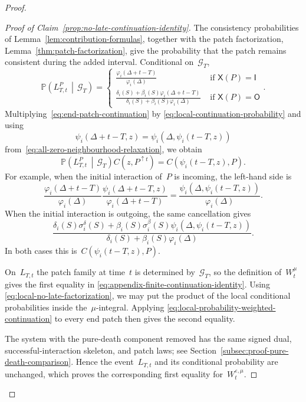\documentclass[EJP,preprint,NODS,nobera]{ejpecp}
\newcommand{\pP}{\mathbb{P}}
\newcommand{\CP}[2]{\pP\bb{#1\,\middle|\,#2}}
\newcommand{\bb}[1]{\left(#1\right)}
\newcommand{\pw}[4]{\left\{\begin{array}{cl}
  #1 &\text{ if } #2 \\
  #3 &\text{ if } #4
\end{array}\right.}
\newcommand{\chg}[1]{{\color{changegreen}#1}}
\begin{document}
\begin{proof}
\begin{proof}[Proof of Claim~\ref{prop:no-late-continuation-identity}]
The \chg{consistency probabilities of Lemma~\ref{lem:contribution-formulas},
together with the patch factorization, Lemma~\ref{thm:patch-factorization},}
give the probability that the patch remains consistent
during the added interval. Conditional on~$\mathcal G_T$,
\begin{equation}
\label{eq:local-continuation-probability}
\CP{L_{T,t}^P}{\mathcal G_T}
=
\pw{
\displaystyle
\frac{\varphi_i(\Delta+t-T)}{\varphi_i(\Delta)}
}{\mathsf X(P)=\mathsf I}
{
\displaystyle
\frac{
\delta_i(S)+\beta_i(S)\varphi_i(\Delta+t-T)
}{
\delta_i(S)+\beta_i(S)\varphi_i(\Delta)
}
}{\mathsf X(P)=\mathsf O}.
\end{equation}
Multiplying~\eqref{eq:end-patch-continuation} by
\eqref{eq:local-continuation-probability} and using
\begin{equation*}
\psi_i(\Delta+t-T,z)
=
\psi_i\bb{\Delta,\psi_i(t-T,z)}
\end{equation*}
from~\eqref{eq:all-zero-neighbourhood-relaxation}, we obtain
\begin{equation}
\label{eq:local-probability-weighted-continuation}
\CP{L_{T,t}^P}{\mathcal G_T}
C\bb{z,P^{\uparrow t}}
=
C\bb{\psi_i(t-T,z),P}.
\end{equation}
For example, when the initial interaction of~$P$ is incoming, the left-hand
side is
\begin{equation*}
\frac{\varphi_i(\Delta+t-T)}{\varphi_i(\Delta)}
\frac{\psi_i(\Delta+t-T,z)}{\varphi_i(\Delta+t-T)}
=
\frac{\psi_i\bb{\Delta,\psi_i(t-T,z)}}{\varphi_i(\Delta)}.
\end{equation*}
When the initial interaction is outgoing, the same cancellation gives
\begin{equation*}
\frac{
\delta_i(S)\sigma_i^\delta(S)
+
\beta_i(S)\sigma_i^\beta(S)
\psi_i\bb{\Delta,\psi_i(t-T,z)}
}{
\delta_i(S)+\beta_i(S)\varphi_i(\Delta)
}.
\end{equation*}
In both cases this is~$C(\psi_i(t-T,z),P)$.

On~$L_{T,t}$ the patch family at time~$t$ is determined by~$\mathcal G_T$, so the definition of~$W_t^\mu$ gives the first equality in
\eqref{eq:appendix-finite-continuation-identity}. Using
\eqref{eq:local-no-late-factorization}, we may put the product of the local
conditional probabilities inside the~$\mu$-integral. Applying
\eqref{eq:local-probability-weighted-continuation} to every end patch then
gives the second equality.

The system with the pure-death component removed has the same signed dual,
successful-interaction skeleton, and patch laws; see
Section~\ref{subsec:proof-pure-death-comparison}. Hence the event~$L_{T,t}$ and its conditional probability are unchanged, which proves the
corresponding first equality for~$W_t^{\varepsilon,\mu}$.


\end{proof}
\end{proof}
\end{document}
